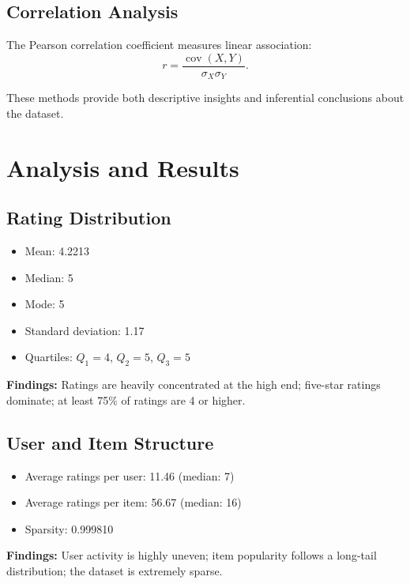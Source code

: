 \documentclass[conference]{IEEEtran}
\begin{document}
\subsection{Correlation Analysis}

The Pearson correlation coefficient measures linear association:
\begin{equation}
    r = \frac{\operatorname{cov}(X,Y)}{\sigma_X \sigma_Y}.
\end{equation}

These methods provide both descriptive insights and inferential conclusions about the dataset.

\section{Analysis and Results}

\subsection{Rating Distribution}

\begin{itemize}
    \item Mean: 4.2213
    \item Median: 5
    \item Mode: 5
    \item Standard deviation: 1.17
    \item Quartiles: $Q_1 = 4$, $Q_2 = 5$, $Q_3 = 5$
\end{itemize}

\textbf{Findings:} Ratings are heavily concentrated at the high end; five-star ratings dominate; at least 75\% of ratings are 4 or higher.

\subsection{User and Item Structure}

\begin{itemize}
    \item Average ratings per user: 11.46 (median: 7)
    \item Average ratings per item: 56.67 (median: 16)
    \item Sparsity: 0.999810
\end{itemize}

\textbf{Findings:} User activity is highly uneven; item popularity follows a long-tail distribution; the dataset is extremely sparse.
\end{document}
